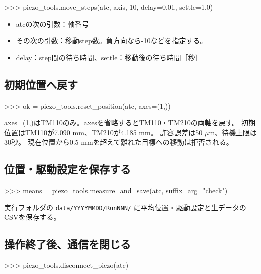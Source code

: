 \documentclass[a4paper,11pt]{ltjsarticle}
\begin{document}
\begin{command}

>>> piezo_tools.move_steps(atc, axis, 10, delay=0.01, settle=1.0)

\end{command}

\begin{itemize}

\item atcの次の引数：軸番号

\item その次の引数：移動step数。負方向なら-10などを指定する。

\item delay：step間の待ち時間、settle：移動後の待ち時間［秒］

\end{itemize}

\subsection{初期位置へ戻す}

\begin{command}
>>> ok = piezo_tools.reset_position(atc, axes=(1,))
\end{command}

axes=(1,)はTM110のみ。axesを省略するとTM110・TM210の両軸を戻す。
初期位置はTM110が7.090 mm、TM210が4.185 mm。
許容誤差は50 $\mu$m、待機上限は30秒。
現在位置から0.5 mmを超えて離れた目標への移動は拒否される。

\subsection{位置・駆動設定を保存する}

\begin{command}
>>> means = piezo_tools.measure_and_save(atc, suffix_arg="check")
\end{command}

実行フォルダの \texttt{data/YYYYMMDD/RunNNN/} に平均位置・駆動設定と生データのCSVを保存する。

\subsection{操作終了後、通信を閉じる}

\begin{command}

>>> piezo_tools.disconnect_piezo(atc)

\end{command}
\end{document}
